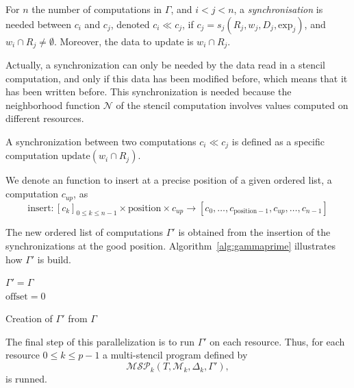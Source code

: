 \begin{mydef}
For $n$ the number of computations in $\Gamma$, and $i<j<n$, a \textit{synchronisation} is needed between $c_i$ and $c_j$, denoted $c_i \ll c_j$, if $c_j=s_j(R_j,w_j,D_j,\text{exp}_j)$, and $w_i \cap R_j \neq \emptyset$. Moreover, the data to update is $w_i \cap R_j$.
\end{mydef}

Actually, a synchronization can only be needed by the data read in a stencil computation, and only if this data has been modified before, which means that it has been written before. This synchronization is needed because the neighborhood function $\mathcal{N}$ of the stencil computation involves values computed on different resources.

\begin{mydef}
A synchronization between two computations $c_i \ll c_j$ is defined as a specific computation $\text{update}(w_i \cap R_j)$.
\end{mydef}

We denote an function to insert at a precise position of a given ordered list, a computation $c_{up}$, as
\begin{equation}
\text{insert} : [c_k]_{0 \leq k \leq n-1} \times \text{position} \times c_{up} \rightarrow [c_0,\dots,c_{\text{position}-1},c_{up},\dots,c_{n-1}]
\end{equation}

The new ordered list of computations $\Gamma'$ is obtained from the insertion of the synchronizations at the good position. Algorithm~\ref{alg:gammaprime} illustrates how $\Gamma'$ is build.
\begin{center}
\begin{algorithm}
$\Gamma' = \Gamma$\\
$\text{offset} = 0$\\
\caption{Creation of $\Gamma'$ from $\Gamma$}
\label{alg:gammaprime}
\end{algorithm}
\end{center}

 The final step of this parallelization is to run $\Gamma'$ on each resource. Thus, for each resource $0 \leq k \leq p-1$ a multi-stencil program defined by
\begin{equation}
\mathcal{MSP}_k(T,\mathcal{M}_k,\Delta_k,\Gamma'),
\end{equation}
is runned.

